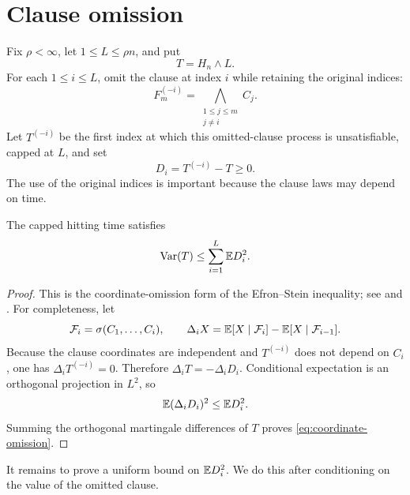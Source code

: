 \section{Clause omission}
\label{sec:omission}

Fix $\rho<\infty$, let $1\le L\le\rho n$, and put
\[
    T=H_n\wedge L.
\]
For each $1\le i\le L$, omit the clause at index $i$ while retaining the
original indices:
\[
    F_m^{(-i)}
    =\bigwedge_{\substack{1\le j\le m\\j\ne i}} C_j.
\]
Let $T^{(-i)}$ be the first index at which this omitted-clause process is
unsatisfiable, capped at $L$, and set
\[
    D_i=T^{(-i)}-T\ge0.
\]
The use of the original indices is important because the clause laws may
depend on time.

\begin{lemma}
\label{lem:coordinate-omission}
The capped hitting time satisfies
\begin{equation}
    \operatorname{Var}(T)\le\sum_{i=1}^L\mathbb E D_i^2.
    \label{eq:coordinate-omission}
\end{equation}
\end{lemma}

\begin{proof}
This is the coordinate-omission form of the Efron--Stein inequality; see
\citet{EfronStein1981} and \citet[Section~3.2]{BBLM2005}.  For completeness,
let
\[
    \mathcal F_i=\sigma(C_1,\dots,C_i),
    \qquad
    \Delta_iX=\mathbb E[X\mid\mathcal F_i]-\mathbb E[X\mid\mathcal F_{i-1}].
\]
Because the clause coordinates are independent and $T^{(-i)}$ does not
depend on $C_i$, one has $\Delta_iT^{(-i)}=0$.  Therefore
$\Delta_iT=-\Delta_iD_i$.  Conditional expectation is an orthogonal
projection in $L^2$, so
\[
    \mathbb E(\Delta_iD_i)^2\le\mathbb E D_i^2.
\]
Summing the orthogonal martingale differences of $T$ proves
\eqref{eq:coordinate-omission}.
\end{proof}

It remains to prove a uniform bound on $\mathbb E D_i^2$.  We do this after
conditioning on the value of the omitted clause.
